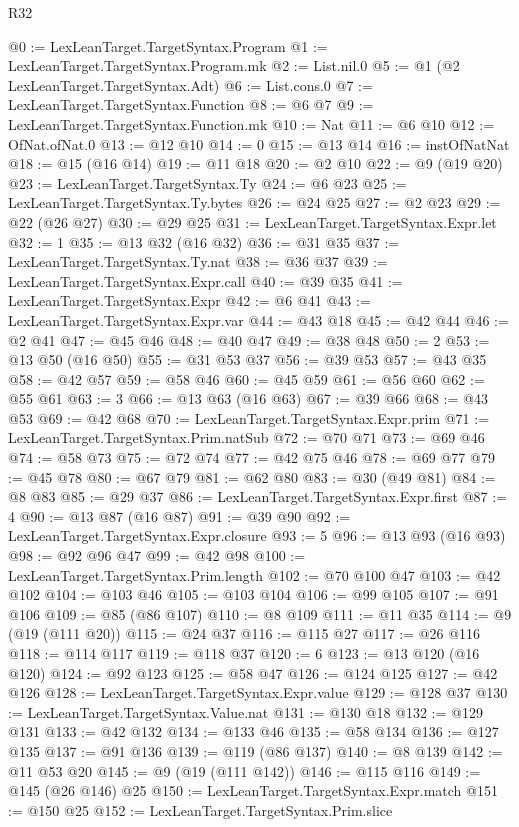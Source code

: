 \begin{lexlean}{R32}
\begin{coremodule}
@0 := LexLeanTarget.TargetSyntax.Program
@1 := LexLeanTarget.TargetSyntax.Program.mk
@2 := List.nil.{0}
@5 := @1 (@2 LexLeanTarget.TargetSyntax.Adt)
@6 := List.cons.{0}
@7 := LexLeanTarget.TargetSyntax.Function
@8 := @6 @7
@9 := LexLeanTarget.TargetSyntax.Function.mk
@10 := Nat
@11 := @6 @10
@12 := OfNat.ofNat.{0}
@13 := @12 @10
@14 := 0
@15 := @13 @14
@16 := instOfNatNat
@18 := @15 (@16 @14)
@19 := @11 @18
@20 := @2 @10
@22 := @9 (@19 @20)
@23 := LexLeanTarget.TargetSyntax.Ty
@24 := @6 @23
@25 := LexLeanTarget.TargetSyntax.Ty.bytes
@26 := @24 @25
@27 := @2 @23
@29 := @22 (@26 @27)
@30 := @29 @25
@31 := LexLeanTarget.TargetSyntax.Expr.let
@32 := 1
@35 := @13 @32 (@16 @32)
@36 := @31 @35
@37 := LexLeanTarget.TargetSyntax.Ty.nat
@38 := @36 @37
@39 := LexLeanTarget.TargetSyntax.Expr.call
@40 := @39 @35
@41 := LexLeanTarget.TargetSyntax.Expr
@42 := @6 @41
@43 := LexLeanTarget.TargetSyntax.Expr.var
@44 := @43 @18
@45 := @42 @44
@46 := @2 @41
@47 := @45 @46
@48 := @40 @47
@49 := @38 @48
@50 := 2
@53 := @13 @50 (@16 @50)
@55 := @31 @53 @37
@56 := @39 @53
@57 := @43 @35
@58 := @42 @57
@59 := @58 @46
@60 := @45 @59
@61 := @56 @60
@62 := @55 @61
@63 := 3
@66 := @13 @63 (@16 @63)
@67 := @39 @66
@68 := @43 @53
@69 := @42 @68
@70 := LexLeanTarget.TargetSyntax.Expr.prim
@71 := LexLeanTarget.TargetSyntax.Prim.natSub
@72 := @70 @71
@73 := @69 @46
@74 := @58 @73
@75 := @72 @74
@77 := @42 @75 @46
@78 := @69 @77
@79 := @45 @78
@80 := @67 @79
@81 := @62 @80
@83 := @30 (@49 @81)
@84 := @8 @83
@85 := @29 @37
@86 := LexLeanTarget.TargetSyntax.Expr.first
@87 := 4
@90 := @13 @87 (@16 @87)
@91 := @39 @90
@92 := LexLeanTarget.TargetSyntax.Expr.closure
@93 := 5
@96 := @13 @93 (@16 @93)
@98 := @92 @96 @47
@99 := @42 @98
@100 := LexLeanTarget.TargetSyntax.Prim.length
@102 := @70 @100 @47
@103 := @42 @102
@104 := @103 @46
@105 := @103 @104
@106 := @99 @105
@107 := @91 @106
@109 := @85 (@86 @107)
@110 := @8 @109
@111 := @11 @35
@114 := @9 (@19 (@111 @20))
@115 := @24 @37
@116 := @115 @27
@117 := @26 @116
@118 := @114 @117
@119 := @118 @37
@120 := 6
@123 := @13 @120 (@16 @120)
@124 := @92 @123
@125 := @58 @47
@126 := @124 @125
@127 := @42 @126
@128 := LexLeanTarget.TargetSyntax.Expr.value
@129 := @128 @37
@130 := LexLeanTarget.TargetSyntax.Value.nat
@131 := @130 @18
@132 := @129 @131
@133 := @42 @132
@134 := @133 @46
@135 := @58 @134
@136 := @127 @135
@137 := @91 @136
@139 := @119 (@86 @137)
@140 := @8 @139
@142 := @11 @53 @20
@145 := @9 (@19 (@111 @142))
@146 := @115 @116
@149 := @145 (@26 @146) @25
@150 := LexLeanTarget.TargetSyntax.Expr.match
@151 := @150 @25
@152 := LexLeanTarget.TargetSyntax.Prim.slice

\end{coremodule}
\end{lexlean}
